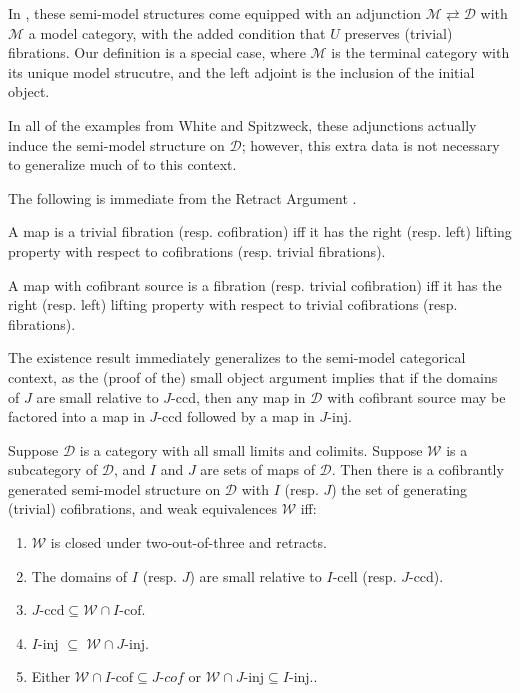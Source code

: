 \documentclass[a4paper,10pt
,draft
]{article}%
\renewcommand{\1}{\eta}%
\begin{document}
\begin{remark}
      In \cite{Spi01,Wh16}, these semi-model structures come equipped with an adjunction $\mathcal M \rightleftarrows \mathcal D$ with $\mathcal M$ a model category,
      with the added condition that $U$ preserves (trivial) fibrations.
      Our definition is a special case, where $\mathcal M$ is the terminal category with its unique model strucutre,
      and the left adjoint is the inclusion of the initial object.

      In all of the examples from White and Spitzweck, these adjunctions actually induce the semi-model structure on $\mathcal D$;
      however, this extra data is not necessary to generalize much of \cite{Hov99} to this context.
\end{remark}

The following is immediate from the Retract Argument \cite[Lemma 1.1.9]{Hov99}.
\begin{lemma}
      A map is a trivial fibration (resp. cofibration) iff it has the right (resp. left) lifting property with respect to cofibrations (resp. trivial fibrations).
      
      A map with cofibrant source is a fibration (resp. trivial cofibration) iff it has the right (resp. left) lifting property with respect to trivial cofibrations (resp. fibrations).
\end{lemma}

The existence result \cite[Theorem 2.1.19]{Hov99} immediately generalizes to the semi-model categorical context,
as the (proof of the) small object argument \cite[Lemma 2.1.14]{Hov99} implies that
if the domains of $J$ are small relative to $J$-ccd,
then any map in $\mathcal D$ with cofibrant source may be factored into a map in $J$-ccd followed by a map in $J$-inj.
\begin{theorem}
      \label{SEMIMS_THM}
      Suppose $\mathcal D$ is a category with all small limits and colimits.
      Suppose $\mathcal W$ is a subcategory of $\mathcal D$, and $I$ and $J$ are sets of maps of $\mathcal D$.
      Then there is a cofibrantly generated semi-model structure on $\mathcal D$ with
      $I$ (resp. $J$) the set of generating (trivial) cofibrations, and weak equivalences $\mathcal W$ iff:
      \begin{enumerate}[label = (\roman*)]
      \item $\mathcal W$ is closed under two-out-of-three and retracts.
      \item The domains of $I$ (resp. $J$) are small relative to $I$-cell (resp. $J$-ccd).
      \item $J\text{-ccd} \subseteq \mathcal W \cap I\text{-cof}$.
      \item $I$-inj $\subseteq$ $\mathcal W \cap J$-inj.
      \item Either $\mathcal W \cap I\text{-cof} \subseteq J\textit{-cof}$ or $\mathcal W \cap J\text{-inj} \subseteq I\text{-inj}.$.
      \end{enumerate}
\end{theorem}


\fi%




\newpage
{} %

\end{document}
